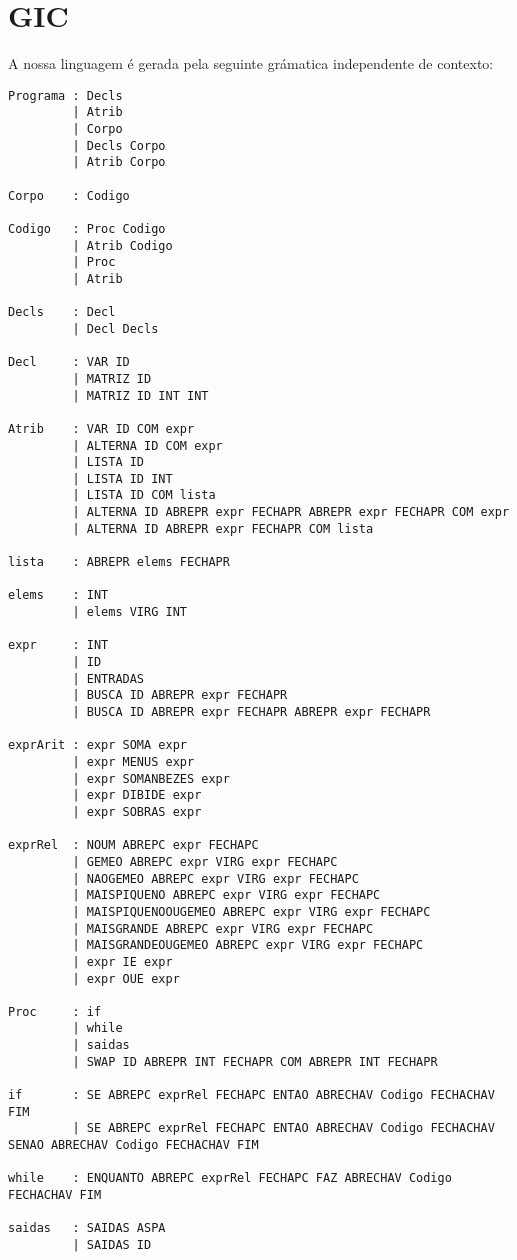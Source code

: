 \documentclass[11pt,a4paper]{report}%
\begin{document}
\section{GIC}
A nossa linguagem é gerada pela seguinte grámatica independente de contexto:
\begin{verbatim}
Programa : Decls
         | Atrib
         | Corpo
         | Decls Corpo
         | Atrib Corpo

Corpo    : Codigo

Codigo   : Proc Codigo
         | Atrib Codigo
         | Proc
         | Atrib

Decls    : Decl
         | Decl Decls

Decl     : VAR ID
         | MATRIZ ID
         | MATRIZ ID INT INT

Atrib    : VAR ID COM expr
         | ALTERNA ID COM expr
         | LISTA ID
         | LISTA ID INT
         | LISTA ID COM lista
         | ALTERNA ID ABREPR expr FECHAPR ABREPR expr FECHAPR COM expr
         | ALTERNA ID ABREPR expr FECHAPR COM lista

lista    : ABREPR elems FECHAPR

elems    : INT
         | elems VIRG INT

expr     : INT
         | ID
         | ENTRADAS
         | BUSCA ID ABREPR expr FECHAPR
         | BUSCA ID ABREPR expr FECHAPR ABREPR expr FECHAPR

exprArit : expr SOMA expr
         | expr MENUS expr
         | expr SOMANBEZES expr
         | expr DIBIDE expr
         | expr SOBRAS expr

exprRel  : NOUM ABREPC expr FECHAPC
         | GEMEO ABREPC expr VIRG expr FECHAPC
         | NAOGEMEO ABREPC expr VIRG expr FECHAPC
         | MAISPIQUENO ABREPC expr VIRG expr FECHAPC
         | MAISPIQUENOOUGEMEO ABREPC expr VIRG expr FECHAPC
         | MAISGRANDE ABREPC expr VIRG expr FECHAPC
         | MAISGRANDEOUGEMEO ABREPC expr VIRG expr FECHAPC
         | expr IE expr
         | expr OUE expr

Proc     : if
         | while
         | saidas
         | SWAP ID ABREPR INT FECHAPR COM ABREPR INT FECHAPR

if       : SE ABREPC exprRel FECHAPC ENTAO ABRECHAV Codigo FECHACHAV FIM
         | SE ABREPC exprRel FECHAPC ENTAO ABRECHAV Codigo FECHACHAV SENAO ABRECHAV Codigo FECHACHAV FIM

while    : ENQUANTO ABREPC exprRel FECHAPC FAZ ABRECHAV Codigo FECHACHAV FIM

saidas   : SAIDAS ASPA
         | SAIDAS ID             
\end{verbatim}
\end{document}
